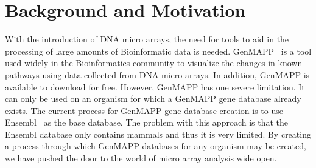 \section{Background and Motivation}
With the introduction of DNA micro arrays, the need for tools
to aid in the processing of large amounts of Bioinformatic 
data is needed.  GenMAPP~\cite{genmapp} is a tool used widely in the
Bioinformatics community to visualize the changes in known 
pathways using data collected from DNA micro arrays. In 
addition, GenMAPP is available to download for free. However,
GenMAPP has one severe limitation.  It can only be used on 
an organism for which a GenMAPP gene database already exists.  
The current process for GenMAPP gene database creation is to 
use Ensembl~\cite{ensembl} as the base database.  
The problem with this approach is that the Ensembl database 
only contains mammals and thus it is very limited.  
By creating a process through which GenMAPP databases for 
any organism may be created, we have pushed the door to 
the world of micro array analysis wide open. 


